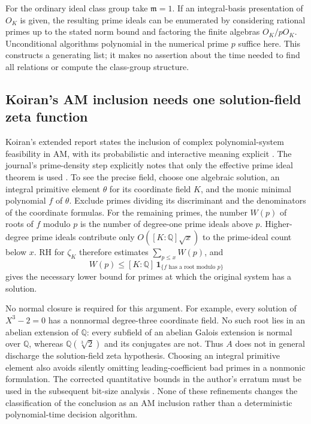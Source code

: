 \documentclass[11pt]{article}
\newcommand{\Q}{\mathbb Q}
\theoremstyle{definition}
\theoremstyle{remark}
\begin{document}
For the ordinary ideal class group take $\mathfrak m=1$.
If an integral-basis presentation of $O_K$ is given, the resulting
prime ideals can be enumerated by considering rational primes up to
the stated norm bound and factoring the finite algebras
$O_K/pO_K$.  Unconditional algorithms polynomial in the numerical
prime $p$ suffice here.  This constructs a generating list;
it makes no assertion about the time needed to find all relations
or compute the class-group structure.

\subsection{Koiran's AM inclusion needs one solution-field zeta function}

Koiran's extended report states the inclusion of complex polynomial-system
feasibility in $\mathrm{AM}$, with its probabilistic and interactive
meaning explicit \citep[Theorem~2, pp.~5--6]{KoiranExtended1996}.
The journal's prime-density step explicitly notes that only the effective
prime ideal theorem is used \citep[Theorem~9, p.~282]{Koiran1996}.
To see the precise field, choose one algebraic solution, an integral
primitive element $\theta$ for its coordinate field $K$, and the monic
minimal polynomial $f$ of $\theta$. Exclude primes dividing its
discriminant and the denominators of the coordinate formulas.
For the remaining primes, the number $W(p)$ of roots of $f$ modulo $p$
is the number of degree-one prime ideals above $p$.
Higher-degree prime ideals contribute only $O([K:\Q]\sqrt{x})$ to
the prime-ideal count below $x$. RH for $\zeta_K$ therefore estimates
$\sum_{p\le x}W(p)$, and
\[
 W(p)\le[K:\Q]\,\mathbf1_{\{f\text{ has a root modulo }p\}}
\]
gives the necessary lower bound for primes at which the original system
has a solution.

No normal closure is required for this argument.  For example, every
solution of $X^3-2=0$ has a nonnormal degree-three coordinate field.
No such root lies in an abelian extension of $\mathbb Q$: every
subfield of an abelian Galois extension is normal over $\mathbb Q$,
whereas $\mathbb Q(\sqrt[3]{2})$ and its conjugates are not.
Thus $A$ does not in general discharge the solution-field zeta
hypothesis. Choosing an integral primitive element also avoids silently
omitting leading-coefficient bad primes in a nonmonic formulation.
The corrected quantitative bounds in the author's erratum must be used
in the subsequent bit-size analysis \citep{KoiranErratum1997}.
None of these refinements changes the classification of the conclusion
as an $\mathrm{AM}$ inclusion rather than a deterministic polynomial-time
decision algorithm.
\end{document}
